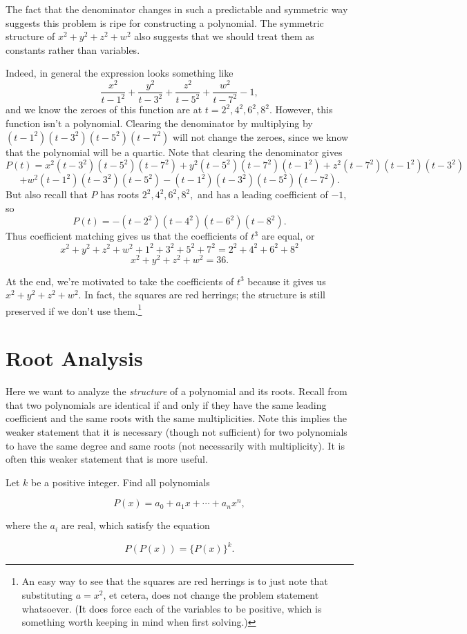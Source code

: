 \documentclass[mast]{lucky}
\begin{document}
\begin{sol}
The fact that the denominator changes in such a predictable and symmetric way suggests this problem is ripe for constructing a polynomial. The symmetric structure of $x^2+y^2+z^2+w^2$ also suggests that we should treat them as constants rather than variables.

Indeed, in general the expression looks something like
\[\frac{x^2}{t-1^2}+\frac{y^2}{t-3^2}+\frac{z^2}{t-5^2}+\frac{w^2}{t-7^2}-1,\]
and we know the zeroes of this function are at $t=2^2,4^2,6^2,8^2.$ However, this function isn't a polynomial. Clearing the denominator by multiplying by $(t-1^2)(t-3^2)(t-5^2)(t-7^2)$ will not change the zeroes, since we know that the polynomial will be a quartic. Note that clearing the denominator gives
\[P(t)=x^2(t-3^2)(t-5^2)(t-7^2)+y^2(t-5^2)(t-7^2)(t-1^2)+z^2(t-7^2)(t-1^2)(t-3^2)\]
\[+w^2(t-1^2)(t-3^2)(t-5^2)-(t-1^2)(t-3^2)(t-5^2)(t-7^2).\]
But also recall that $P$ has roots $2^2,4^2,6^2,8^2,$ and has a leading coefficient of $-1,$ so
\[P(t)=-(t-2^2)(t-4^2)(t-6^2)(t-8^2).\]
Thus coefficient matching gives us that the coefficients of $t^3$ are equal, or
\[x^2+y^2+z^2+w^2+1^2+3^2+5^2+7^2=2^2+4^2+6^2+8^2\]
\[x^2+y^2+z^2+w^2=36.\]
\end{sol}

At the end, we're motivated to take the coefficients of $t^3$ because it gives us $x^2+y^2+z^2+w^2.$ In fact, the squares are red herrings; the structure is still preserved if we don't use them.\footnote{An easy way to see that the squares are red herrings is to just note that substituting $a=x^2$, et cetera, does not change the problem statement whatsoever. (It does force each of the variables to be positive, which is something worth keeping in mind when first solving.)}

\section{Root Analysis}

Here we want to analyze the \textit{structure} of a polynomial and its roots. Recall from  that two polynomials are identical if and only if they have the same leading coefficient and the same roots with the same multiplicities. Note this implies the weaker statement that it is necessary (though not sufficient) for two polynomials to have the same degree and same roots (not necessarily with multiplicity). It is often this weaker statement that is more useful.

\begin{exam}[Canada]
Let $ k$ be a positive integer. Find all polynomials

\[ P(x) = a_0 + a_1 x + \cdots + a_n x^n,\]

where the $ a_i$ are real, which satisfy the equation

\[P(P(x)) = \{ P(x) \}^k.\]
\end{exam}
\end{document}
